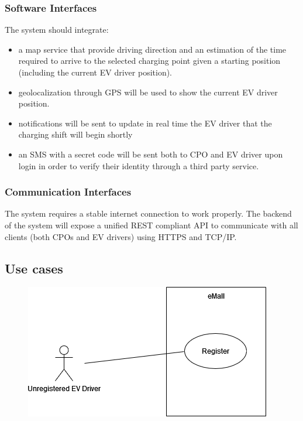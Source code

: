 \subsubsection{Software Interfaces}
The system should integrate:
\begin{itemize}
    \item a map service that provide driving direction
    and an estimation of the time required to arrive to the selected charging point 
    given a starting position (including the current EV driver position).
    \item geolocalization through GPS will be used to show the current EV driver 
    position.
    \item notifications will be sent to update in real time the EV driver 
    that the charging shift will begin shortly
    \item an SMS with a secret code will be sent both to CPO and EV driver
    upon login in order to verify their identity through a third party service.          
\end{itemize} 

\subsubsection{Communication Interfaces}
The system requires a stable internet connection to work properly.
The backend of the system will expose a unified REST compliant API to communicate
with all clients (both CPOs and EV drivers) using HTTPS and TCP/IP. 
 

\subsection{Use cases}

\begin{figure}[H]
    \centering
    \includegraphics[scale=0.6]{src/use_case_diagram/driver_registration.png}
\end{figure}

